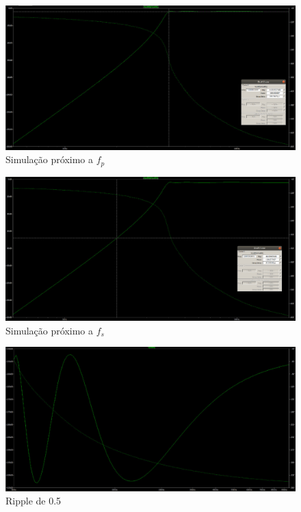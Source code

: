 \documentclass[14pt, oneside]{book}
\theoremstyle{definition}
\begin{document}
            \begin{figure}[H]
                \centering
                \includegraphics[scale=0.4]{fp.jpeg}
                \caption{Simulação próximo a $f_p$}
                \label{a}
            \end{figure}
            
            \begin{figure}[H]
                \centering
                \includegraphics[scale=0.4]{fs.jpeg}
                \caption{Simulação próximo a $f_s$}
                \label{a}
            \end{figure}
            
            \begin{figure}[H]
                \centering
                \includegraphics[scale=0.4]{ripple.jpeg}
                \caption{Ripple de 0.5}
                \label{a}
            \end{figure}
            
\end{document}
